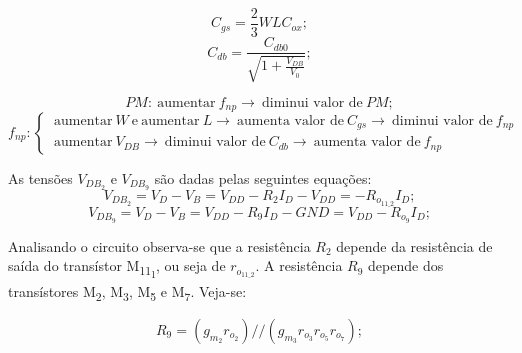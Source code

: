 \documentclass[11pt]{article}
\numberwithin{equation}{section}
\begin{document}
\vspace{-3mm}
\begin{equation}
C_{gs} = \frac{2}{3} W L C_{ox};
\end{equation}
\vspace{-2mm}
\begin{equation}
C_{db} = \frac{C_{db0}}{\sqrt{1 + \frac{V_{DB}}{V_0}}};
\end{equation}
	
\vspace{1mm}

\begin{equation}
	PM: ~\text{aumentar}~f_{np}\rightarrow~\text{diminui valor de}~PM;
\end{equation}
\begin{equation}
f_{np}:  \begin{cases} ~\text{aumentar}~W~\text{e}~\text{aumentar}~L \rightarrow~\text{aumenta valor de}~C_{gs} \rightarrow~\text{diminui valor de}~f_{np} \\ ~\text{aumentar}~V_{DB} \rightarrow~\text{diminui valor de}~C_{db} \rightarrow~\text{aumenta valor de}~f_{np}\end{cases}
\end{equation}

\vspace{3mm}

As tensões $V_{DB_2}$ e $V_{DB_9}$ são dadas pelas seguintes equações:
	\vspace{-3mm}
	\begin{equation}
	V_{DB_2} = V_D - V_B = V_{DD} - R_{2} I_D - V_{DD} = - R_{o_{11\_2}} I_D ;
	\end{equation}
	\begin{equation}
	V_{DB_9} = V_D - V_B = V_{DD} - R_{9} I_D - GND = V_{DD} - R_{o_9} I_D ;
	\end{equation}
	
\vspace{1mm}
Analisando o circuito observa-se que a resistência $R_{2}$ depende da resistência de saída do transístor  M\textsubscript{11\textsubscript{1}}, ou seja de $r_{o_{11\_2}}$. A resistência $R_{9}$ depende dos transístores M\textsubscript{2}, M\textsubscript{3}, M\textsubscript{5} e M\textsubscript{7}. Veja-se:
	
\vspace{-3mm}
\begin{equation}
R_{9} = \left(g_{m_2}r_{o_2}\right)//\left(g_{m_3}r_{o_3}r_{o_5}r_{o_7}\right);
\end{equation}
\end{document}

